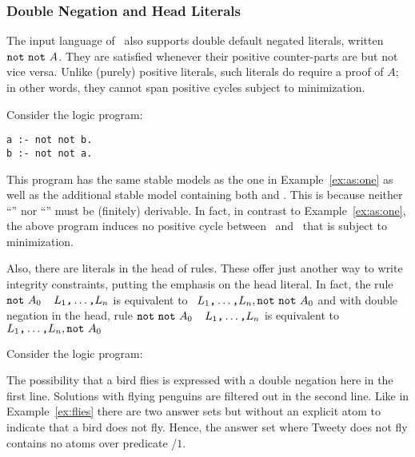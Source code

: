 \subsubsection{Double Negation and Head Literals}\label{subsec:gringo:double}

The input language of \gringo\ also supports double default negated literals,
written $\texttt{not}~\texttt{not}~A$.
They are satisfied whenever their positive counter-parts are but not vice versa. 
Unlike (purely) positive literals,
such literals do require a proof of $A$;
in other words, they cannot span positive cycles subject to minimization.
%
\begin{example}\label{ex:as:dneg}
Consider the logic program:

\begin{lstlisting}[numbers=none]
a :- not not b.
b :- not not a.
\end{lstlisting}
%
This program has the same stable models as the one in Example~\ref{ex:as:one} 
as well as the additional stable model containing both  and .
This is because neither ``'' nor ``'' must be (finitely) derivable.
In fact, in contrast to Example~\ref{ex:as:one}, 
the above program induces no positive cycle between~ and~ that is subject to minimization.
\eexample
\end{example}

Also, there are literals in the head of rules.
These offer just another way to write integrity constraints,
putting the emphasis on the head literal.
In fact, the rule
\(\texttt{not}~A_0\)~\code{:-}~\(L_1\text{\texttt{,}}\dots\text{\texttt{,}}L_n\)
is equivalent to 
\code{:-}~\(L_1\text{\texttt{,}}\dots\text{\texttt{,}}L_n,\texttt{not}~\texttt{not}~A_0\)
and with double negation in the head, rule
\(\texttt{not}~\texttt{not}~A_0\)~\code{:-}~\(L_1\text{\texttt{,}}\dots\text{\texttt{,}}L_n\)
is equivalent to 
\code{:-}~\(L_1\text{\texttt{,}}\dots\text{\texttt{,}}L_n,\texttt{not}~A_0\)

\begin{example}\label{ex:as:flynn}
Consider the logic program:


The possibility that a bird flies is expressed with a double negation here in the first line.
Solutions with flying penguins are filtered out in the second line.
Like in Example~\ref{ex:flies} there are two answer sets
but without an explicit atom to indicate that a bird does not fly.
Hence, the answer set where Tweety does not fly contains no atoms over predicate /$1$.
\eexample
\end{example}

